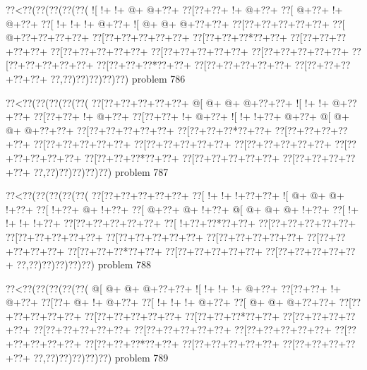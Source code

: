 \vbox{\vbox{\goo
\0??<\0??(\0??(\0??(\0??(\0??(
\- ![\- !+\- !+\- @+\- @+\0??+
\0??[\0??+\0??+\- !+\- @+\0??+
\0??[\- @+\0??+\- !+\- @+\0??+
\0??[\- !+\- !+\- !+\- @+\0??+
\- ![\- @+\- @+\- @+\0??+\0??+
\0??[\0??+\0??+\0??+\0??+\0??+
\0??[\- @+\0??+\0??+\0??+\0??+
\0??[\0??+\0??+\0??+\0??+\0??+
\0??[\0??+\0??+\0??*\0??+\0??+
\0??[\0??+\0??+\0??+\0??+\0??+
\0??[\0??+\0??+\0??+\0??+\0??+
\0??[\0??+\0??+\0??+\0??+\0??+
\0??[\0??+\0??+\0??+\0??+\0??+
\0??[\0??+\0??+\0??+\0??+\0??+
\0??[\0??+\0??+\0??*\0??+\0??+
\0??[\0??+\0??+\0??+\0??+\0??+
\0??[\0??+\0??+\0??+\0??+\0??+
\0??,\0??)\0??)\0??)\0??)\0??)
}
\hfil problem 786\hfil\break
}

\vbox{\vbox{\goo
\0??<\0??(\0??(\0??(\0??(\0??(
\0??[\0??+\0??+\0??+\0??+\0??+
\- @[\- @+\- @+\- @+\0??+\0??+
\- ![\- !+\- !+\- @+\0??+\0??+
\0??[\0??+\0??+\- !+\- @+\0??+
\0??[\0??+\0??+\- !+\- @+\0??+
\- ![\- !+\- !+\0??+\- @+\0??+
\- @[\- @+\- @+\- @+\0??+\0??+
\0??[\0??+\0??+\0??+\0??+\0??+
\0??[\0??+\0??+\0??*\0??+\0??+
\0??[\0??+\0??+\0??+\0??+\0??+
\0??[\0??+\0??+\0??+\0??+\0??+
\0??[\0??+\0??+\0??+\0??+\0??+
\0??[\0??+\0??+\0??+\0??+\0??+
\0??[\0??+\0??+\0??+\0??+\0??+
\0??[\0??+\0??+\0??*\0??+\0??+
\0??[\0??+\0??+\0??+\0??+\0??+
\0??[\0??+\0??+\0??+\0??+\0??+
\0??,\0??)\0??)\0??)\0??)\0??)
}
\hfil problem 787\hfil\break
}

\vbox{\vbox{\goo
\0??<\0??(\0??(\0??(\0??(\0??(
\0??[\0??+\0??+\0??+\0??+\0??+
\0??[\- !+\- !+\- !+\0??+\0??+
\- ![\- @+\- @+\- @+\- !+\0??+
\0??[\- !+\0??+\- @+\- !+\0??+
\0??[\- @+\0??+\- @+\- !+\0??+
\- @[\- @+\- @+\- @+\- !+\0??+
\0??[\- !+\- !+\- !+\- !+\0??+
\0??[\0??+\0??+\0??+\0??+\0??+
\0??[\- !+\0??+\0??*\0??+\0??+
\0??[\0??+\0??+\0??+\0??+\0??+
\0??[\0??+\0??+\0??+\0??+\0??+
\0??[\0??+\0??+\0??+\0??+\0??+
\0??[\0??+\0??+\0??+\0??+\0??+
\0??[\0??+\0??+\0??+\0??+\0??+
\0??[\0??+\0??+\0??*\0??+\0??+
\0??[\0??+\0??+\0??+\0??+\0??+
\0??[\0??+\0??+\0??+\0??+\0??+
\0??,\0??)\0??)\0??)\0??)\0??)
}
\hfil problem 788\hfil\break
}

\vbox{\vbox{\goo
\0??<\0??(\0??(\0??(\0??(\0??(
\- @[\- @+\- @+\- @+\0??+\0??+
\- ![\- !+\- !+\- !+\- @+\0??+
\0??[\0??+\0??+\- !+\- @+\0??+
\0??[\0??+\- @+\- !+\- @+\0??+
\0??[\- !+\- !+\- !+\- @+\0??+
\0??[\- @+\- @+\- @+\0??+\0??+
\0??[\0??+\0??+\0??+\0??+\0??+
\0??[\0??+\0??+\0??+\0??+\0??+
\0??[\0??+\0??+\0??*\0??+\0??+
\0??[\0??+\0??+\0??+\0??+\0??+
\0??[\0??+\0??+\0??+\0??+\0??+
\0??[\0??+\0??+\0??+\0??+\0??+
\0??[\0??+\0??+\0??+\0??+\0??+
\0??[\0??+\0??+\0??+\0??+\0??+
\0??[\0??+\0??+\0??*\0??+\0??+
\0??[\0??+\0??+\0??+\0??+\0??+
\0??[\0??+\0??+\0??+\0??+\0??+
\0??,\0??)\0??)\0??)\0??)\0??)
}
\hfil problem 789\hfil\break
}

